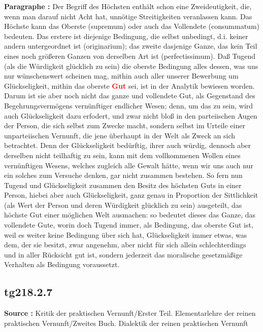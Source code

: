 \documentclass[a4paper,12pt,twoside]{book}
\newcommand{\match}[1]{\textcolor{red}{\textbf{#1}}}
\begin{document}
	\textbf{Paragraphe : }Der Begriff des Höchsten enthält schon eine Zweideutigkeit, die, wenn man darauf nicht Acht hat, unnötige Streitigkeiten veranlassen kann. Das Höchste kann das Oberste (supremum) oder auch das Vollendete (consummatum) bedeuten. Das erstere ist diejenige Bedingung, die selbst unbedingt, d.i. keiner andern untergeordnet ist (originarium); das zweite dasjenige Ganze, das kein Teil eines noch größeren Ganzen von derselben Art ist (perfectissimum). Daß Tugend (als die Würdigkeit glücklich zu sein) die oberste Bedingung alles dessen, was uns nur wünschenswert scheinen mag, mithin auch aller unserer Bewerbung um Glückseligkeit, mithin das oberste \match{Gut} sei, ist in der Analytik bewiesen worden. Darum ist sie aber noch nicht das ganze und vollendete Gut, als Gegenstand des Begehrungsvermögens vernünftiger endlicher Wesen; denn, um das zu sein, wird auch Glückseligkeit dazu erfodert, und zwar nicht bloß in den parteiischen Augen der Person, die sich selbst zum Zwecke macht, sondern selbst im Urteile einer unparteiischen Vernunft, die jene überhaupt in der Welt als Zweck an sich betrachtet. Denn der Glückseligkeit bedürftig, ihrer auch würdig, dennoch aber derselben nicht teilhaftig zu sein, kann mit dem vollkommenen Wollen eines vernünftigen Wesens, welches zugleich alle Gewalt hätte, wenn wir uns auch nur ein solches zum Versuche denken, gar nicht zusammen bestehen. So fern nun Tugend  und Glückseligkeit zusammen den Besitz des höchsten Guts in einer Person, hiebei aber auch Glückseligkeit, ganz genau in Proportion der Sittlichkeit (als Wert der Person und deren Würdigkeit glücklich zu sein) ausgeteilt, das höchste Gut einer möglichen Welt ausmachen: so bedeutet dieses das Ganze, das vollendete Gute, worin doch Tugend immer, als Bedingung, das oberste Gut ist, weil es weiter keine Bedingung über sich hat, Glückseligkeit immer etwas, was dem, der sie besitzt, zwar angenehm, aber nicht für sich allein schlechterdings und in aller Rücksicht gut ist, sondern jederzeit das moralische gesetzmäßige Verhalten als Bedingung voraussetzt. 
	
	\subsection*{tg218.2.7} 
	\textbf{Source : }Kritik der praktischen Vernunft/Erster Teil. Elementarlehre der reinen praktischen Vernunft/Zweites Buch. Dialektik der reinen praktischen Vernunft\\  
	
\end{document}
